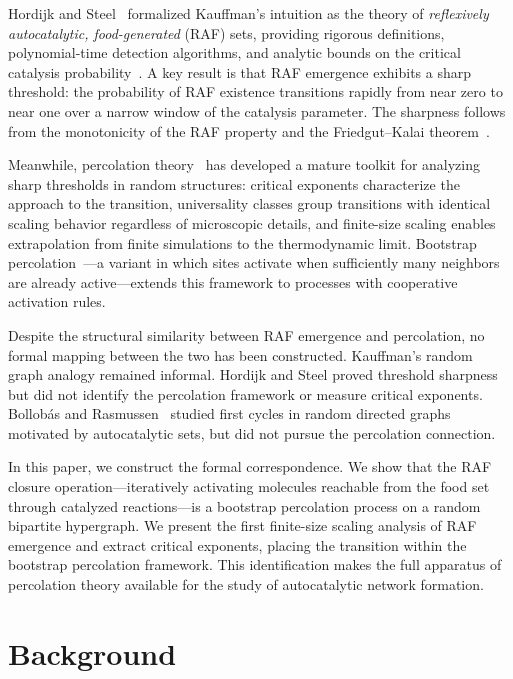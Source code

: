 \documentclass[preprint,12pt]{elsarticle}
\begin{document}
Hordijk and Steel~\cite{hordijk2004detecting} formalized Kauffman's
intuition as the theory of \emph{reflexively autocatalytic,
food-generated} (RAF) sets, providing rigorous definitions,
polynomial-time detection algorithms, and analytic bounds
on the critical catalysis probability~\cite{mossel2005random,
hordijk2011required,hordijk2019molecular}.
A key result is that RAF emergence exhibits a sharp threshold:
the probability of RAF existence transitions rapidly from near zero
to near one over a narrow window of the catalysis parameter.
The sharpness follows from the monotonicity of the RAF property
and the Friedgut--Kalai theorem~\cite{friedgut1996monotone}.

Meanwhile, percolation theory~\cite{stauffer2018introduction,
bollobas2001random} has developed a mature toolkit for analyzing
sharp thresholds in random structures: critical exponents characterize
the approach to the transition, universality classes group
transitions with identical scaling behavior regardless of
microscopic details, and finite-size scaling enables
extrapolation from finite simulations to the thermodynamic limit.
Bootstrap percolation~\cite{balogh2012sharp}---a variant in which
sites activate when sufficiently many neighbors are already
active---extends this framework to processes with
cooperative activation rules.

Despite the structural similarity between RAF emergence and
percolation, no formal mapping between the two has been
constructed. Kauffman's random graph analogy remained informal.
Hordijk and Steel proved threshold sharpness but did not
identify the percolation framework or measure critical exponents.
Bollob\'as and Rasmussen~\cite{bollobas1989first} studied
first cycles in random directed graphs motivated by
autocatalytic sets, but did not pursue the percolation connection.

In this paper, we construct the formal correspondence.
We show that the RAF closure operation---iteratively activating
molecules reachable from the food set through catalyzed
reactions---is a bootstrap percolation process on a random
bipartite hypergraph. We present the first finite-size scaling
analysis of RAF emergence and extract critical exponents,
placing the transition within the bootstrap percolation
framework. This identification makes the full apparatus of
percolation theory available for the study of autocatalytic
network formation.

\section{Background}
\label{sec:background}
\end{document}
